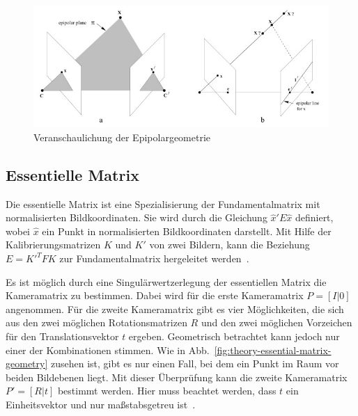 \begin{figure}[h!]
    \centering
    \includegraphics[width=\textwidth]{src/img/hartley_2003_fundamental_matrix.jpg}
    \caption{Veranschaulichung der Epipolargeometrie~\cite[Fig. 9.1]{hartley_2003}}
    \label{fig:theory-fundamental-matrix}
\end{figure}

\subsection{Essentielle Matrix}\label{sec:essential-mat}
Die essentielle Matrix ist eine Spezialisierung der Fundamentalmatrix mit normalisierten Bildkoordinaten.
Sie wird durch die Gleichung $\hat{x}'E\hat{x}$ definiert, wobei $\hat{x}$ ein Punkt in normalisierten Bildkoordinaten darstellt.
Mit Hilfe der Kalibrierungsmatrizen $K$ und $K'$ von zwei Bildern, kann die Beziehung $E=K'^TFK$ zur Fundamentalmatrix hergeleitet werden~\cite[Kapitel 9.6]{hartley_2003}.

Es ist möglich durch eine Singulärwertzerlegung der essentiellen Matrix die Kameramatrix zu bestimmen.
Dabei wird für die erste Kameramatrix $P=[I|0]$ angenommen. 
Für die zweite Kameramatrix gibt es vier Möglichkeiten, die sich aus den zwei möglichen Rotationsmatrizen $R$ und den zwei möglichen Vorzeichen für den Translationsvektor $t$ ergeben.
Geometrisch betrachtet kann jedoch nur einer der Kombinationen stimmen.
Wie in Abb.~\ref{fig:theory-essential-matrix-geometry} zusehen ist, gibt es nur einen Fall, bei dem ein Punkt im Raum vor beiden Bildebenen liegt.
Mit dieser Überprüfung kann die zweite Kameramatrix $P'=[R|t]$ bestimmt werden.
Hier muss beachtet werden, dass $t$ ein Einheitsvektor und nur maßstabsgetreu ist~\cite[Kapitel 9.6.3]{hartley_2003}.


